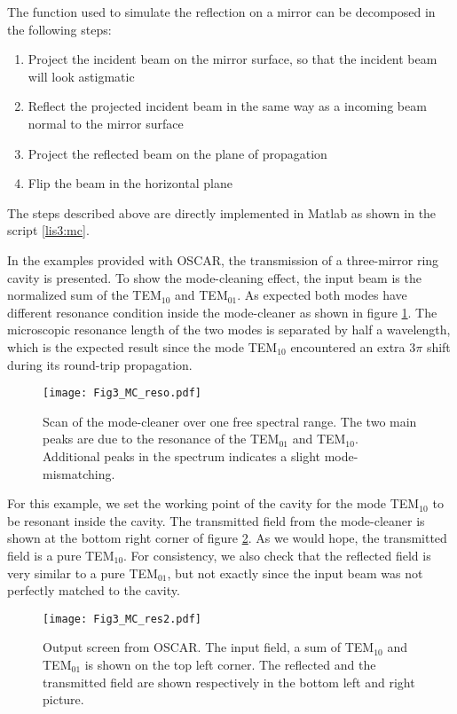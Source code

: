The function used to simulate the reflection on a mirror can be decomposed in the following steps:
\begin{enumerate}
  \item Project the incident beam on the mirror surface, so that the incident beam will look astigmatic
  \item Reflect the projected incident beam in the same way as a incoming beam normal to the mirror surface
  \item Project the reflected beam on the plane of propagation
  \item Flip the beam in the horizontal plane
\end{enumerate}

The steps described above are directly implemented in Matlab as shown in the script \ref{lis3:mc}.

In the examples provided with OSCAR, the transmission of a three-mirror ring cavity is presented. To show the mode-cleaning effect, the input beam is the normalized sum of the TEM$_{10}$ and TEM$_{01}$. As expected both modes have different resonance condition inside the mode-cleaner as shown in figure \ref{fig3:MC_reso}. The microscopic resonance length of the two modes is separated by half a wavelength, which is the expected result since the mode TEM$_{10}$ encountered an extra $3\pi$ shift during its round-trip propagation.


\begin{figure}
\begin{center}
\texttt{[image: Fig3\_MC\_reso.pdf]}
\end{center}
\caption{Scan of the mode-cleaner over one free spectral range. The two main peaks are due to the resonance of the TEM$_{01}$ and TEM$_{10}$. Additional peaks in the spectrum indicates a slight mode-mismatching. \label{fig3:MC_reso}}
\end{figure}


For this example, we set the working point of the cavity for the mode TEM$_{10}$ to be resonant inside the cavity. The transmitted field from the mode-cleaner is shown at the bottom right corner of figure \ref{fig3:MC_res}. As we would hope, the transmitted field is a pure TEM$_{10}$. For consistency, we also check that the reflected field is very similar to a pure TEM$_{01}$, but not exactly since the input beam was not perfectly matched to the cavity.

\begin{figure}
\begin{center}
\texttt{[image: Fig3\_MC\_res2.pdf]}
\end{center}
\caption{Output screen from OSCAR. The input field, a sum of TEM$_{10}$ and TEM$_{01}$ is shown on the top left corner. The reflected and the transmitted field are shown respectively in the bottom left and right picture.  \label{fig3:MC_res}}
\end{figure}


